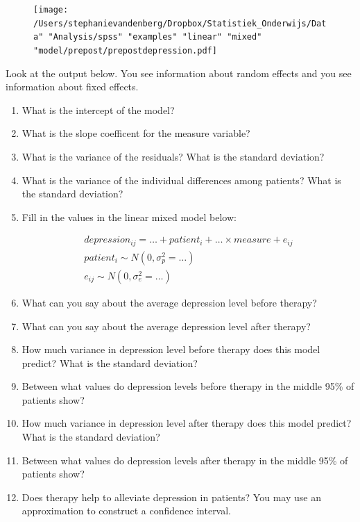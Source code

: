 \documentclass[]{report}\usepackage[]{graphicx}\usepackage[]{color}
\begin{document}
\begin{figure}[h]
    \begin{center}
       \texttt{[image: /Users/stephanievandenberg/Dropbox/Statistiek\_Onderwijs/Data" "Analysis/spss" "examples" "linear" "mixed" "model/prepost/prepostdepression.pdf]}
    \end{center}
\end{figure}


Look at the output below. You see information about random effects and you see information about fixed effects. 

\begin{enumerate}
\item What is the intercept of the model?\\
\item  What is the slope coefficent for the measure variable?\\
\item  What is the variance of the residuals? What is the standard deviation?\\
\item  What is the variance of the individual differences among patients? What is the standard deviation?\\
\item  Fill in the values in the linear mixed model below:

\begin{eqnarray}
depression_{ij} = \dots + patient_i + \dots \times measure + e_{ij} \\
patient_i \sim N(0, \sigma_p^2 = \dots)\\
e_{ij} \sim N(0, \sigma_e^2 = \dots)
\end{eqnarray}


\item  What can you say about the average depression level before therapy? \\
\item  What can you say about the average depression level after therapy?\\
\item  How much variance in depression level before therapy does this model predict? What is the standard deviation? \\
\item  Between what values do depression levels before therapy in the middle 95\% of patients show?\\
\item  How much variance in depression level after therapy does this model predict? What is the standard deviation? \\
\item  Between what values do depression levels after therapy in the middle 95\% of patients show?\\
\item  Does therapy help to alleviate depression in patients? You may use an approximation to construct a confidence interval.


\end{enumerate}
\end{document}
